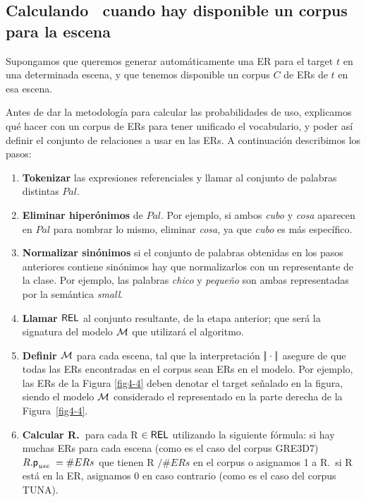 \subsection{Calculando \puse\ cuando hay disponible un corpus para la escena}
\label{sec:learning-corpus}

Supongamos que queremos generar autom\'aticamente una ER para el target $t$ en una
determinada escena, y que tenemos disponible un corpus $C$ de ERs de $t$
en esa escena.

Antes de dar la metodolog\'ia para calcular las probabilidades de uso, explicamos qu\'e hacer con un corpus de ERs para tener unificado el vocabulario, y poder as\'i definir el conjunto de relaciones a usar en las ERs. A continuaci\'on describimos los pasos:

\begin{enumerate}
\item \textbf{Tokenizar} las expresiones referenciales y llamar al conjunto de palabras distintas
 $Pal$. 

\item \textbf{Eliminar hiper\'onimos} de $Pal$. Por ejemplo, si ambos \emph{cubo} y
  \emph{cosa} aparecen en $Pal$ para nombrar lo mismo, eliminar \emph{cosa}, ya que \emph{cubo} es m\'as espec\'ifico.

\item \textbf{Normalizar sin\'onimos} si el conjunto de palabras obtenidas en los pasos anteriores contiene
  sin\'onimos hay que normalizarlos con un representante de la clase. Por ejemplo, las palabras \emph{chico}
  y \emph{peque\~no} son ambas representadas por la sem\'antica \emph{small}.

\item \textbf{Llamar $\textsf{REL}$} al conjunto resultante, de la etapa anterior; que ser\'a la signatura del modelo $\mathcal{M}$ que utilizar\'a el algoritmo.

\item \textbf{Definir $\mathcal{M}$} para cada escena, tal que la interpretaci\'on
 $|\!|\cdot|\!|$ asegure de que todas las ERs encontradas en el corpus sean ERs en
  el modelo. Por ejemplo, las ERs de la Figura \ref{fig4-4} deben denotar el target se\~nalado en la figura, siendo el modelo 
$\mathcal{M}$ considerado el representado en la parte derecha de la Figura~\ref{fig4-4}.
\item \textbf{Calcular R.\puse\ }para cada R $\in \textsf{REL}$ utilizando la siguiente f\'ormula: si
  hay muchas ERs para cada escena (como es el caso del corpus GRE3D7) $R.\textsf{p}_\textit{use}\ = \#ERs$ que tienen R $/\#ERs$ en el corpus o asignamos 1 a R.\puse \ si R est\'a en la ER, asignamos 0 en caso contrario (como es el caso del corpus TUNA).
\end{enumerate}

